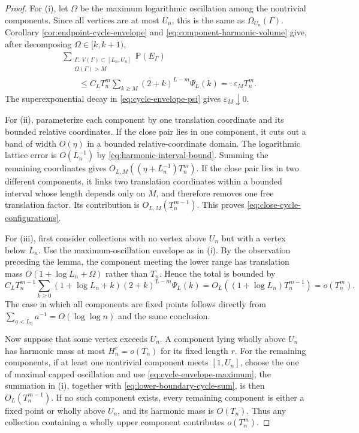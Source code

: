 \documentclass[11pt]{article}
\theoremstyle{remark}
\newcommand{\Pp}{\mathbb P}
\begin{document}
\begin{proof}
For (i), let $\Omega$ be the maximum logarithmic oscillation among the
nontrivial components.  Since all vertices are at most $U_n$, this is the same
as $\Omega_{U_n}(\Gamma)$.  Corollary
\ref{cor:endpoint-cycle-envelope} and
\eqref{eq:component-harmonic-volume} give, after decomposing
$\Omega\in[k,k+1)$,
\[
\begin{aligned}&\sum_{\substack{\Gamma:\ V(\Gamma)\subset[L_n,U_n]\\
                  \Omega(\Gamma)>M}}
\Pp(E_\Gamma)\\
&\qquad\le C_LT_n^m
\sum_{k\ge M}(2+k)^{L-m}\Psi_L(k)
=:\varepsilon_MT_n^m.
\end{aligned}
\]
The superexponential decay in \eqref{eq:cycle-envelope-psi} gives
$\varepsilon_M\downarrow0$.

For (ii), parameterize each component by one translation coordinate and its
bounded relative coordinates.  If the close pair lies in one component, it
cuts out a band of width $O(\eta)$ in a bounded relative-coordinate domain.
The logarithmic lattice error is $O(L_n^{-1})$ by
\eqref{eq:harmonic-interval-bound}.  Summing the remaining coordinates gives
$O_{L,M}((\eta+L_n^{-1})T_n^m)$.  If the close pair lies in two different
components, it links two translation coordinates within a bounded interval
whose length depends only on $M$, and therefore removes one free translation
factor.  Its contribution is $O_{L,M}(T_n^{m-1})$.  This proves
\eqref{eq:close-cycle-configurations}.

For (iii), first consider collections with no vertex above $U_n$ but with a
vertex below $L_n$.  Use the maximum-oscillation envelope as in (i).  By the
observation preceding the lemma, the component meeting the lower range has
translation mass $O(1+\log L_n+\Omega)$ rather than $T_n$.  Hence the total is
bounded by
\[
        C_LT_n^{m-1}
        \sum_{k\ge0}(1+\log L_n+k)(2+k)^{L-m}\Psi_L(k)
        =O_L((1+\log L_n)T_n^{m-1})
        =o(T_n^m).
\tag{10.55}\label{eq:lower-boundary-cycle-sum}
\]
The case in which all components are fixed points follows directly from
$\sum_{a<L_n}a^{-1}=O(\log\log n)$ and the same conclusion.

Now suppose that some vertex exceeds $U_n$.  A component lying wholly above
$U_n$ has harmonic mass at most $H_n^r=o(T_n)$ for its fixed length $r$.
For the remaining components, if at least one nontrivial component meets
$[1,U_n]$, choose the one of maximal capped oscillation and use
\eqref{eq:cycle-envelope-maximum}; the summation in (i), together with
\eqref{eq:lower-boundary-cycle-sum}, is then $O_L(T_n^{m-1})$.  If no such
component exists, every remaining component is either a fixed point or wholly
above $U_n$, and its harmonic mass is $O(T_n)$.  Thus any collection
containing a wholly upper component contributes $o(T_n^m)$.


\end{proof}
\end{document}
